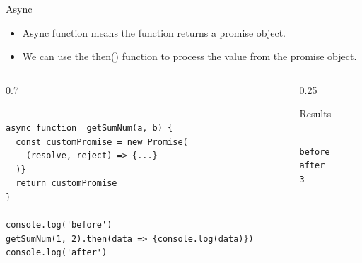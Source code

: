 \begin{frame}[fragile]{Async}

\begin{itemize}
	\item Async function means the function returns a promise object. 
	\item We can use the then() function to process the value from the promise object. 
\end{itemize}

\begin{columns}%
\begin{column}{0.7\textwidth}%
\begin{Code}{}%
\begin{lstlisting}[firstnumber=1, label=glabels, xleftmargin=0pt, basicstyle=\tiny]% 

async function  getSumNum(a, b) {
  const customPromise = new Promise(
    (resolve, reject) => {...}
  )}
  return customPromise
}

console.log('before')
getSumNum(1, 2).then(data => {console.log(data)})
console.log('after')
\end{lstlisting}%
\end{Code}%
\end{column}%
\begin{column}{0.25\textwidth}%
\begin{Command}{Results}%
\begin{lstlisting}[firstnumber=1, label=glabels, xleftmargin=0pt, basicstyle=\tiny]% 

before
after
3
\end{lstlisting}%
\end{Command}%
\end{column}%
\end{columns}%
\end{frame}

